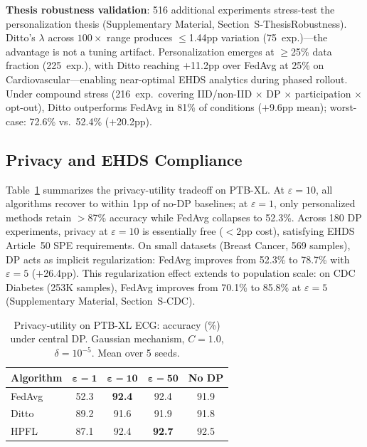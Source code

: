 \documentclass[conference]{IEEEtran}
\begin{document}
\textbf{Thesis robustness validation}: 516 additional experiments stress-test the personalization thesis (Supplementary Material, Section~S-ThesisRobustness). Ditto's $\lambda$ across $100\times$ range produces $\leq$1.44pp variation (75~exp.)---the advantage is not a tuning artifact. Personalization emerges at $\geq$25\% data fraction (225~exp.), with Ditto reaching $+$11.2pp over FedAvg at 25\% on Cardiovascular---enabling near-optimal EHDS analytics during phased rollout. Under compound stress (216~exp.\ covering IID/non-IID $\times$ DP $\times$ participation $\times$ opt-out), Ditto outperforms FedAvg in 81\% of conditions ($+$9.6pp mean); worst-case: 72.6\% vs.\ 52.4\% ($+$20.2pp).

\subsection{Privacy and EHDS Compliance}

Table~\ref{tab:dp_mini} summarizes the privacy-utility tradeoff on PTB-XL. At $\varepsilon{=}10$, all algorithms recover to within 1pp of no-DP baselines; at $\varepsilon{=}1$, only personalized methods retain $>$87\% accuracy while FedAvg collapses to 52.3\%. Across 180 DP experiments, privacy at $\varepsilon{=}10$ is essentially free ($<$2pp cost), satisfying EHDS Article~50 SPE requirements. On small datasets (Breast Cancer, 569 samples), DP acts as implicit regularization: FedAvg improves from 52.3\% to 78.7\% with $\varepsilon{=}5$ ($+$26.4pp). This regularization effect extends to population scale: on CDC Diabetes (253K samples), FedAvg improves from 70.1\% to 85.8\% at $\varepsilon{=}5$ (Supplementary Material, Section~S-CDC).

\begin{table}[htbp]
\centering
\caption{Privacy-utility on PTB-XL ECG: accuracy (\%) under central DP. Gaussian mechanism, $C{=}1.0$, $\delta{=}10^{-5}$. Mean over 5 seeds.}
\label{tab:dp_mini}
\small
\begin{tabular}{lcccc}
\toprule
\textbf{Algorithm} & $\boldsymbol{\varepsilon{=}1}$ & $\boldsymbol{\varepsilon{=}10}$ & $\boldsymbol{\varepsilon{=}50}$ & \textbf{No DP} \\
\midrule
FedAvg & 52.3 & \textbf{92.4} & 92.4 & 91.9 \\
Ditto & 89.2 & 91.6 & 91.9 & 91.8 \\
HPFL & 87.1 & 92.4 & \textbf{92.7} & 92.5 \\
\bottomrule
\end{tabular}
\end{table}
\end{document}

